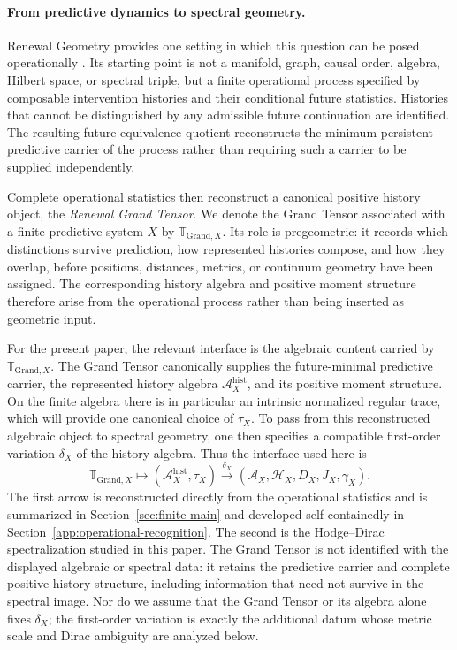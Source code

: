 \documentclass[11pt]{article}
\theoremstyle{definition}
\theoremstyle{remark}
\theoremstyle{definition}
\theoremstyle{remark}
\newcommand{\A}{\mathcal A}
\newcommand{\Hh}{\mathcal H}
\newcommand{\GTX}{\boldsymbol{\mathbb T}_{\mathrm{Grand},X}}
\begin{document}
\paragraph{From predictive dynamics to spectral geometry.}

Renewal Geometry provides one setting in which this question can be posed
operationally \cite{PelissierRenewalSpacetime2026}. Its starting point is not a
manifold, graph, causal order, algebra, Hilbert space, or spectral triple, but a
finite operational process specified by composable intervention histories and
their conditional future statistics. Histories that cannot be distinguished by
any admissible future continuation are identified. The resulting
future-equivalence quotient reconstructs the minimum persistent predictive
carrier of the process rather than requiring such a carrier to be supplied
independently.

Complete operational statistics then reconstruct a canonical positive history
object, the \emph{Renewal Grand Tensor}.  We denote the Grand Tensor associated
with a finite predictive system $X$ by $\GTX$.  Its role is pregeometric: it
records which distinctions survive prediction, how represented histories compose,
and how they overlap, before positions, distances, metrics, or continuum geometry
have been assigned.  The corresponding history algebra and positive moment
structure therefore arise from the operational process rather than being inserted
as geometric input.

For the present paper, the relevant interface is the algebraic content carried by
$\GTX$.  The Grand Tensor canonically supplies the future-minimal predictive
carrier, the represented history algebra $\A_X^{\mathrm{hist}}$, and its positive
moment structure.  On the finite algebra there is in particular an intrinsic
normalized regular trace, which will provide one canonical choice of $\tau_X$.
To pass from this reconstructed algebraic object to spectral geometry, one then
specifies a compatible first-order variation $\delta_X$ of the history algebra.
Thus the interface used here is
\begin{equation}
\GTX
\longmapsto
(\A_X^{\mathrm{hist}},\tau_X)
\overset{\delta_X}{\longrightarrow}
(\A_X,\Hh_X,D_X,J_X,\gamma_X).
\label{eq:RGT-spectral-interface}
\end{equation}
The first arrow is reconstructed directly from the operational statistics and is
summarized in Section~\ref{sec:finite-main} and developed self-containedly
in Section~\ref{app:operational-recognition}.  The second is the
Hodge--Dirac spectralization studied in this paper.  The Grand Tensor is not
identified with the displayed algebraic or spectral data: it retains the
predictive carrier and complete positive history structure, including information
that need not survive in the spectral image.  Nor do we assume that the Grand
Tensor or its algebra alone fixes $\delta_X$; the first-order variation is exactly
the additional datum whose metric scale and Dirac ambiguity are analyzed below.
\end{document}
